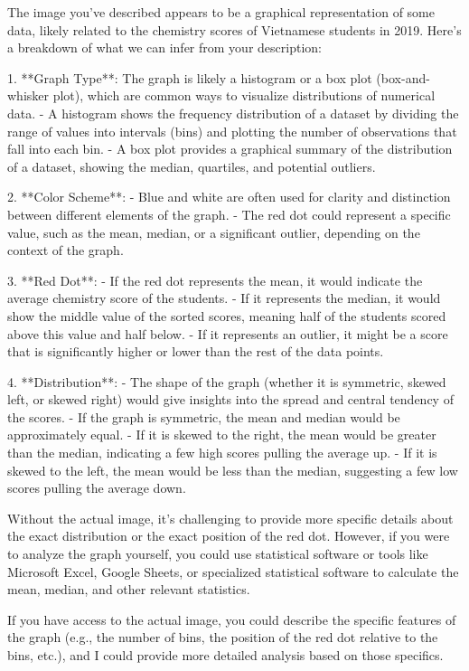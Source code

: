 The image you've described appears to be a graphical representation of some data, likely related to the chemistry scores of Vietnamese students in 2019. Here's a breakdown of what we can infer from your description:

1. **Graph Type**: The graph is likely a histogram or a box plot (box-and-whisker plot), which are common ways to visualize distributions of numerical data.
   - A histogram shows the frequency distribution of a dataset by dividing the range of values into intervals (bins) and plotting the number of observations that fall into each bin.
   - A box plot provides a graphical summary of the distribution of a dataset, showing the median, quartiles, and potential outliers.

2. **Color Scheme**: 
   - Blue and white are often used for clarity and distinction between different elements of the graph.
   - The red dot could represent a specific value, such as the mean, median, or a significant outlier, depending on the context of the graph.

3. **Red Dot**:
   - If the red dot represents the mean, it would indicate the average chemistry score of the students.
   - If it represents the median, it would show the middle value of the sorted scores, meaning half of the students scored above this value and half below.
   - If it represents an outlier, it might be a score that is significantly higher or lower than the rest of the data points.

4. **Distribution**:
   - The shape of the graph (whether it is symmetric, skewed left, or skewed right) would give insights into the spread and central tendency of the scores.
   - If the graph is symmetric, the mean and median would be approximately equal.
   - If it is skewed to the right, the mean would be greater than the median, indicating a few high scores pulling the average up.
   - If it is skewed to the left, the mean would be less than the median, suggesting a few low scores pulling the average down.

Without the actual image, it's challenging to provide more specific details about the exact distribution or the exact position of the red dot. However, if you were to analyze the graph yourself, you could use statistical software or tools like Microsoft Excel, Google Sheets, or specialized statistical software to calculate the mean, median, and other relevant statistics.

If you have access to the actual image, you could describe the specific features of the graph (e.g., the number of bins, the position of the red dot relative to the bins, etc.), and I could provide more detailed analysis based on those specifics.